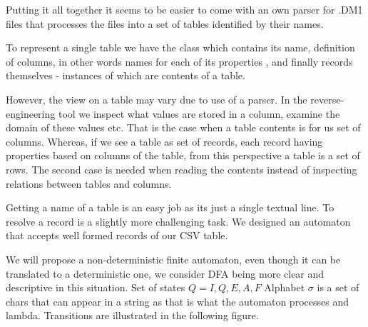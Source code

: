 Putting it all together it seems to be easier to come with an own parser for .DM1 files that processes the files into a set of tables identified by their names. 

To represent a single table we have the class  which contains its name, definition of columns, in other words names for each of its properties , and finally records themselves - instances of  which are contents of a table.

However, the view on a table may vary due to use of a parser. In the reverse-engineering tool we inspect what values are stored in a column, examine the domain of these values etc. That is the case when a table contents is for us set of columns. Whereas, if we see a table as set of records, each record having properties based on columns of the table, from this perspective a table is a set of rows. The second case is needed when reading the contents instead of inspecting relations between tables and columns.

Getting a name of a table is an easy job as its just a single textual line. To resolve a record is a slightly more challenging task. We designed an automaton that accepts well formed records of our CSV table.

We will propose a non-deterministic finite automaton, even though it can be translated to a deterministic one, we consider DFA being more clear and descriptive in this situation.
Set of states $Q = {I, Q, E, A, F}$
Alphabet $\sigma$ is a set of chars that can appear in a string as that is what the automaton processes and lambda.
Transitions are illustrated in the following figure.

